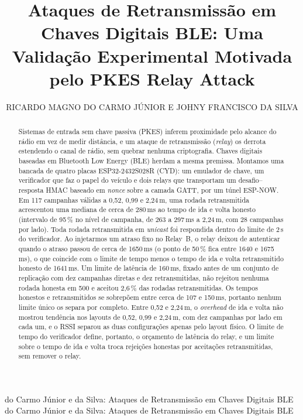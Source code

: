 \documentclass{ieeeaccess}
\begin{document}
\doi{}

\title{Ataques de Retransmissão em Chaves Digitais BLE: Uma Validação Experimental Motivada pelo PKES Relay Attack}

\author{\uppercase{Ricardo Magno do Carmo J\'unior} E \uppercase{Johny Francisco da Silva}}
\address[1]{Programa de Pós-Graduação em Engenharia Elétrica (PPG-EEL), Universidade Federal de Itajubá (UNIFEI), Itajubá, MG, Brasil (e-mail: ricardomdcj@gmail.com; johnyfsilva@gmail.com)}

\markboth
{do Carmo Júnior e da Silva: Ataques de Retransmissão em Chaves Digitais BLE}
{do Carmo Júnior e da Silva: Ataques de Retransmissão em Chaves Digitais BLE}

\begin{abstract}
Sistemas de entrada sem chave passiva (PKES) inferem proximidade pelo alcance do rádio em vez de medir distância, e um ataque de retransmissão (\emph{relay}) os derrota estendendo o canal de rádio, sem quebrar nenhuma criptografia. Chaves digitais baseadas em Bluetooth Low Energy (BLE) herdam a mesma premissa. Montamos uma bancada de quatro placas ESP32-2432S028R (CYD): um emulador de chave, um verificador que faz o papel do veículo e dois relays que transportam um desafio--resposta HMAC baseado em \emph{nonce} sobre a camada GATT, por um túnel ESP-NOW. Em 117 campanhas válidas a 0,52, 0,99 e 2,24\,m, uma rodada retransmitida acrescentou uma mediana de cerca de 280\,ms ao tempo de ida e volta honesto (intervalo de 95\,\% no nível de campanha, de 263 a 297\,ms a 2,24\,m, com 28 campanhas por lado). Toda rodada retransmitida em \emph{unicast} foi respondida dentro do limite de 2\,s do verificador. Ao injetarmos um atraso fixo no Relay~B, o relay deixou de autenticar quando o atraso passou de cerca de 1650\,ms (o ponto de 50\,\% fica entre 1640 e 1675\,ms), o que coincide com o limite de tempo menos o tempo de ida e volta retransmitido honesto de 1641\,ms. Um limite de latência de 160\,ms, fixado antes de um conjunto de replicação com dez campanhas diretas e dez retransmitidas, não rejeitou nenhuma rodada honesta em 500 e aceitou 2,6\,\% das rodadas retransmitidas. Os tempos honestos e retransmitidos se sobrepõem entre cerca de 107 e 150\,ms, portanto nenhum limite único os separa por completo. Entre 0,52 e 2,24\,m, o \emph{overhead} de ida e volta não mostrou tendência nos layouts de 0,52, 0,99 e 2,24\,m, com dez campanhas por lado em cada um, e o RSSI separou as duas configurações apenas pelo layout físico. O limite de tempo do verificador define, portanto, o orçamento de latência do relay, e um limite sobre o tempo de ida e volta troca rejeições honestas por aceitações retransmitidas, sem remover o relay.
\end{abstract}
\end{document}
